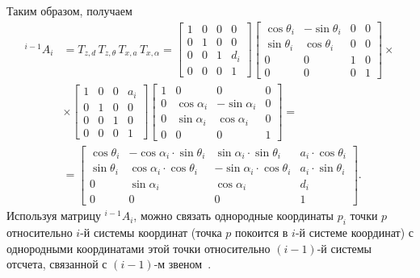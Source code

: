 \documentclass[oneside, final, 14pt]{extarticle}
\begin{document}
Таким образом, получаем
\begin{equation}
\begin{aligned}
   {}^{i-1}A_i & = T_{z,d}\,T_{z,\theta}\,T_{x,a}\,T_{x,\alpha} = 
  \begin{bmatrix}
    1 & 0 & 0 & 0 \\
	0 & 1 & 0 & 0 \\
	0 & 0 & 1 & d_i \\
	0 & 0 & 0 & 1
  \end{bmatrix}
  \begin{bmatrix}
    \cos{\theta_i} & -\sin{\theta_i} & 0 & 0 \\
	\sin{\theta_i} & \cos{\theta_i} & 0 & 0 \\
	0 & 0 & 1 & 0 \\
	0 & 0 & 0 & 1
  \end{bmatrix}
  \times
  \\
  & \times
  \begin{bmatrix}
    1 & 0 & 0 & a_i \\
	0 & 1 & 0 & 0 \\
	0 & 0 & 1 & 0 \\
	0 & 0 & 0 & 1
  \end{bmatrix}
  \begin{bmatrix}
    1 & 0 & 0 & 0 \\
	0 & \cos{\alpha_i} & -\sin{\alpha_i} & 0 \\
	0 & \sin{\alpha_i} & \cos{\alpha_i} & 0 \\
	0 & 0 & 0 & 1
  \end{bmatrix}
  =
  \\
  & =
  \begin{bmatrix}
    \cos{\theta_i} & -\cos{\alpha_i}\cdot\sin{\theta_i} & \sin{\alpha_i}\cdot\sin{\theta_i} & a_i\cdot\cos{\theta_i} \\
	\sin{\theta_i} & \cos{\alpha_i}\cdot\cos{\theta_i} & -\sin{\alpha_i}\cdot\cos{\theta_i} & a_i\cdot\sin{\theta_i} \\
	0 & \sin{\alpha_i} & \cos{\alpha_i} & d_i \\
	0 & 0 & 0 & 1
  \end{bmatrix}
  .
\end{aligned}
\end{equation}
Используя матрицу \({}^{i-1}A_i\), можно связать однородные координаты \(p_i\) точки \(p\) относительно \(i\)-й системы координат (точка \(p\) покоится в \(i\)-й системе координат) с однородными координатами этой точки относительно \((i-1)\)-й системы отсчета, связанной с \((i-1)\)-м звеном~\cite{fu:rob_tech}.
\end{document}
